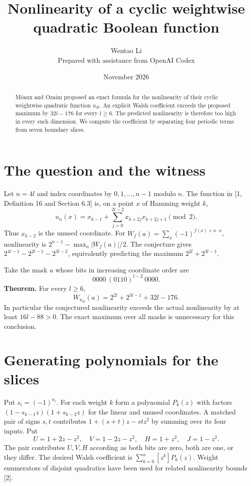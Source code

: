 \documentclass[11pt]{article}
\title{Nonlinearity of a cyclic weightwise quadratic Boolean function}
\author{Wentao Li\\[2pt]\small Prepared with assistance from OpenAI Codex}
\date{November 2026}
\begin{document}
\maketitle
\begin{abstract}
M\'eaux and Ozaim proposed an exact formula for the nonlinearity of their cyclic weightwise quadratic function $u_{4l}$. An explicit Walsh coefficient exceeds the proposed maximum by $32l-176$ for every $l\ge6$. The predicted nonlinearity is therefore too high in every such dimension. We compute the coefficient by separating four periodic terms from seven boundary slices.
\end{abstract}

\section{The question and the witness}
Let $n=4l$ and index coordinates by $0,1,\ldots,n-1$ modulo $n$. The function in [1, Definition 16 and Section 6.3] is, on a point $x$ of Hamming weight $k$,
\[
 u_n(x)=x_{k-1}+\sum_{j=0}^{2l-2}x_{k+2j}x_{k+2j+1}\pmod2 .
\]
Thus $x_{k-2}$ is the unused coordinate. For $W_f(a)=\sum_x(-1)^{f(x)+a\cdot x}$, nonlinearity is $2^{n-1}-\max_a |W_f(a)|/2$. The conjecture gives $2^{4l-1}-2^{2l-1}-2^{3l-2}$, equivalently predicting the maximum $2^{2l}+2^{3l-1}$.

Take the mask $a$ whose bits in increasing coordinate order are
\[
 0000\ (0110)^{l-2}\ 0000 .
\]
\textbf{Theorem.} For every $l\ge6$,
\[
 W_{u_{4l}}(a)=2^{2l}+2^{3l-1}+32l-176.
\]
In particular the conjectured nonlinearity exceeds the actual nonlinearity by at least $16l-88>0$. The exact maximum over all masks is unnecessary for this conclusion.

\section{Generating polynomials for the slices}
Put $s_i=(-1)^{a_i}$. For each weight $k$ form a polynomial $P_k(z)$ with factors $(1-s_{k-1}z)(1+s_{k-2}z)$ for the linear and unused coordinates. A matched pair of signs $s,t$ contributes $1+(s+t)z-stz^2$ by summing over its four inputs. Put
\[
 U=1+2z-z^2,\quad V=1-2z-z^2,\quad H=1+z^2,\quad J=1-z^2 .
\]
The pair contributes $U,V,H$ according as both bits are zero, both are one, or they differ. The desired Walsh coefficient is $\sum_{k=0}^n [z^k]P_k(z)$. Weight enumerators of disjoint quadratics have been used for related nonlinearity bounds [2].
\end{document}
